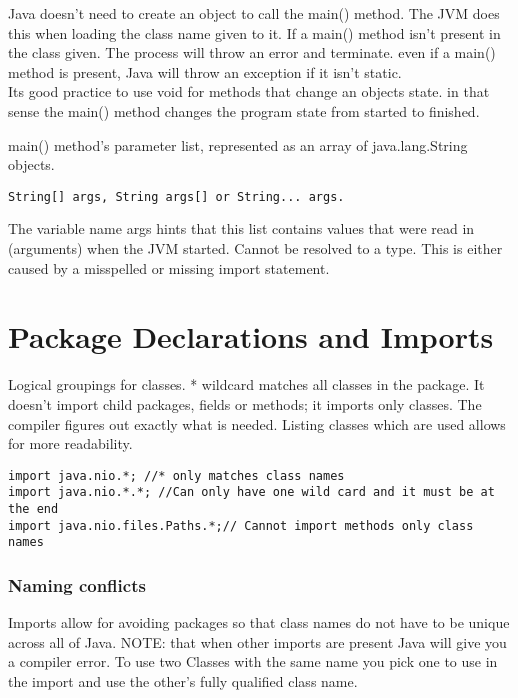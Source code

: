 \documentclass[a4paper]{report}   %
\begin{document}
Java doesn't need to create an object to call the main() method. The JVM does this when loading the class name given to it. If a main() method isn't present in the class given. The process will throw an error and terminate. even if a main() method is present, Java will throw an exception if it isn't static. \\

Its good practice to use void for methods that change an objects state. in that sense the main() method changes the program state from started to finished.

main() method's parameter list, represented as an array of java.lang.String objects.

\begin{lstlisting}
String[] args, String args[] or String... args. 
\end{lstlisting} 

The variable name args hints that this list contains values that were read in (arguments) when the JVM started. Cannot be resolved to a type. This is either caused by a misspelled or missing import statement.

\section{Package Declarations and Imports}

Logical groupings for classes. * wildcard matches all classes in the package. It doesn't import child packages, fields or methods; it imports only classes. The compiler figures out exactly what is needed. Listing classes which are used allows for more readability.

\begin{lstlisting}
import java.nio.*; //* only matches class names
import java.nio.*.*; //Can only have one wild card and it must be at the end
import java.nio.files.Paths.*;// Cannot import methods only class names
\end{lstlisting} 

\subsubsection{Naming conflicts}

Imports allow for avoiding packages so that class names do not have to be unique across all of Java. NOTE: that when other imports are present Java will give you a compiler error. To use two Classes with the same name you pick one to use in the import and use the other's fully qualified class name. 
\end{document}
